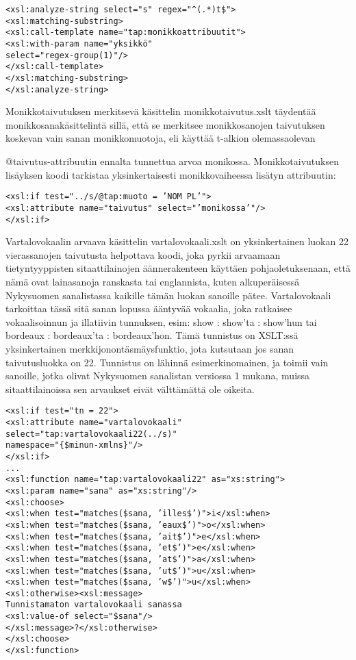 \documentclass[free]{flammie}
\begin{document}
\begin{verbatim}
<xsl:analyze-string select="s" regex="^(.*)t$">
<xsl:matching-substring>
<xsl:call-template name="tap:monikkoattribuutit">
<xsl:with-param name="yksikkö"
select="regex-group(1)"/>
</xsl:call-template>
</xsl:matching-substring>
</xsl:analyze-string>
\end{verbatim}

Monikkotaivutuksen merkitsevä käsittelin monikkotaivutus.xslt täydentää
monikkosanakäsittelintä sillä, että se merkitsee monikkosanojen taivutuksen
koskevan vain sanan monikkomuotoja, eli käyttää t-alkion olemassaolevan

@taivutus-attribuutin ennalta tunnettua arvoa monikossa. Monikkotaivutuksen
lisäyksen koodi tarkistaa yksinkertaisesti monikkovaiheessa lisätyn attribuutin:

\begin{verbatim}
<xsl:if test="../s/@tap:muoto = ’NOM PL’">
<xsl:attribute name="taivutus" select="’monikossa’"/>
</xsl:if>
\end{verbatim}

Vartalovokaalin arvaava käsittelin vartalovokaali.xslt on yksinkertainen
luokan 22 vierassanojen taivutusta helpottava koodi, joka pyrkii arvaamaan tietyntyyppisten sitaattilainojen äännerakenteen käyttäen pohjaoletuksenaan, että nämä ovat lainasanoja ranskasta tai englannista, kuten alkuperäisessä Nykysuomen
sanalistassa kaikille tämän luokan sanoille pätee. Vartalovokaali tarkoittaa tässä sitä sanan lopussa ääntyvää vokaalia, joka ratkaisee vokaalisoinnun ja illatiivin tunnuksen, esim: show : show’ta : show’hun tai bordeaux : bordeaux’ta :
bordeaux’hon. Tämä tunnistus on XSLT:ssä yksinkertainen merkkijonontäsmäysfunktio, jota kutsutaan jos sanan taivutusluokka on 22. Tunnistus on lähinnä esimerkinomainen, ja toimii vain sanoille, jotka olivat Nykysuomen sanalistan versiossa 1 mukana, muissa sitaattilainoissa sen arvaukset eivät välttämättä ole oikeita.

\begin{verbatim}
<xsl:if test="tn = 22">
<xsl:attribute name="vartalovokaali"
select="tap:vartalovokaali22(../s)"
namespace="{$minun-xmlns}"/>
</xsl:if>
...
<xsl:function name="tap:vartalovokaali22" as="xs:string">
<xsl:param name="sana" as="xs:string"/>
<xsl:choose>
<xsl:when test="matches($sana, ’illes$’)">i</xsl:when>
<xsl:when test="matches($sana, ’eaux$’)">o</xsl:when>
<xsl:when test="matches($sana, ’ait$’)">e</xsl:when>
<xsl:when test="matches($sana, ’et$’)">e</xsl:when>
<xsl:when test="matches($sana, ’at$’)">a</xsl:when>
<xsl:when test="matches($sana, ’ut$’)">u</xsl:when>
<xsl:when test="matches($sana, ’w$’)">u</xsl:when>
<xsl:otherwise><xsl:message>
Tunnistamaton vartalovokaali sanassa
<xsl:value-of select="$sana"/>
</xsl:message>?</xsl:otherwise>
</xsl:choose>
</xsl:function>
\end{verbatim}
\end{document}
